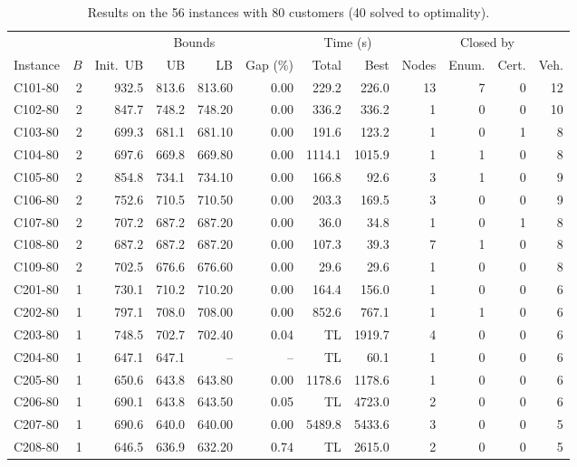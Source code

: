 \documentclass[10pt]{article}
\begin{document}
\begin{table}[p]
\centering
\caption{Results on the 56 instances with 80 customers (40 solved to optimality).}
\label{tab:n80}
\footnotesize
\setlength{\tabcolsep}{5pt}
\begin{tabular}{lrrrrrrrrrrr}
\toprule
 & & \multicolumn{4}{c}{Bounds} & \multicolumn{2}{c}{Time (s)} & & \multicolumn{2}{c}{Closed by} & \\
\cmidrule(lr){3-6}\cmidrule(lr){7-8}\cmidrule(lr){10-11}
Instance & $B$ & Init.\ UB & UB & LB & Gap (\%) & Total & Best & Nodes & Enum. & Cert. & Veh. \\
\midrule
C101-80 & 2 & 932.5 & 813.6 & 813.60 & 0.00 & 229.2 & 226.0 & 13 & 7 & 0 & 12 \\
C102-80 & 2 & 847.7 & 748.2 & 748.20 & 0.00 & 336.2 & 336.2 & 1 & 0 & 0 & 10 \\
C103-80 & 2 & 699.3 & 681.1 & 681.10 & 0.00 & 191.6 & 123.2 & 1 & 0 & 1 & 8 \\
C104-80 & 2 & 697.6 & 669.8 & 669.80 & 0.00 & 1114.1 & 1015.9 & 1 & 1 & 0 & 8 \\
C105-80 & 2 & 854.8 & 734.1 & 734.10 & 0.00 & 166.8 & 92.6 & 3 & 1 & 0 & 9 \\
C106-80 & 2 & 752.6 & 710.5 & 710.50 & 0.00 & 203.3 & 169.5 & 3 & 0 & 0 & 9 \\
C107-80 & 2 & 707.2 & 687.2 & 687.20 & 0.00 & 36.0 & 34.8 & 1 & 0 & 1 & 8 \\
C108-80 & 2 & 687.2 & 687.2 & 687.20 & 0.00 & 107.3 & 39.3 & 7 & 1 & 0 & 8 \\
C109-80 & 2 & 702.5 & 676.6 & 676.60 & 0.00 & 29.6 & 29.6 & 1 & 0 & 0 & 8 \\
\midrule
C201-80 & 1 & 730.1 & 710.2 & 710.20 & 0.00 & 164.4 & 156.0 & 1 & 0 & 0 & 6 \\
C202-80 & 1 & 797.1 & 708.0 & 708.00 & 0.00 & 852.6 & 767.1 & 1 & 1 & 0 & 6 \\
C203-80 & 1 & 748.5 & 702.7 & 702.40 & 0.04 & TL & 1919.7 & 4 & 0 & 0 & 6 \\
C204-80 & 1 & 647.1 & 647.1 & -- & -- & TL & 60.1 & 1 & 0 & 0 & 6 \\
C205-80 & 1 & 650.6 & 643.8 & 643.80 & 0.00 & 1178.6 & 1178.6 & 1 & 0 & 0 & 6 \\
C206-80 & 1 & 690.1 & 643.8 & 643.50 & 0.05 & TL & 4723.0 & 2 & 0 & 0 & 6 \\
C207-80 & 1 & 690.6 & 640.0 & 640.00 & 0.00 & 5489.8 & 5433.6 & 3 & 0 & 0 & 5 \\
C208-80 & 1 & 646.5 & 636.9 & 632.20 & 0.74 & TL & 2615.0 & 2 & 0 & 0 & 5 \\

\end{tabular}
\end{table}
\end{document}
